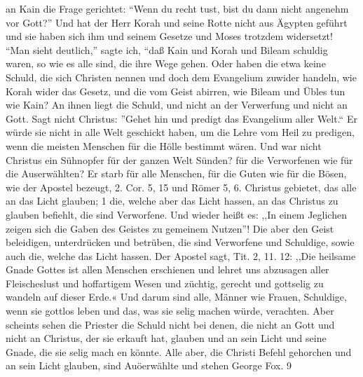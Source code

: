 an Kain die Frage gerichtet: "`Wenn du recht tust, bist du dann
nicht angenehm vor Gott?"' Und hat der Herr Korah und seine
Rotte nicht aus Ägypten geführt und sie haben sich ihm und
seinem Gesetze und Moses trotzdem widersetzt! "`Man sieht deutlich,"'
sagte ich, "`daß Kain und Korah und Bileam schuldig waren, so
wie es alle sind, die ihre Wege gehen. Oder haben die etwa
keine Schuld, die sich Christen nennen und doch dem Evangelium
zuwider handeln, wie Korah wider das Gesetz, und die vom
Geist abirren, wie Bileam und Übles tun wie Kain? An ihnen
liegt die Schuld, und nicht an der Verwerfung und nicht an Gott.
Sagt nicht Christus: "'Gehet hin und predigt das Evangelium
aller Welt."` Er würde sie nicht in alle Welt geschickt haben, um
die Lehre vom Heil zu predigen, wenn die meisten Menschen für
die Hölle bestimmt wären. Und war nicht Christus ein Sühnopfer 
für der ganzen Welt Sünden? für die Verworfenen wie für
die Auserwählten? Er starb für alle Menschen, für die Guten
wie für die Bösen, wie der Apostel bezeugt, 2. Cor. 5, 15 und
Römer 5, 6.  Christus gebietet, das alle an das Licht glauben; 1
die, welche aber das Licht hassen, an das Christus zu glauben
befiehlt, die sind Verworfene. Und wieder heißt es: ,,In einem
Jeglichen zeigen sich die Gaben des Geistes zu gemeinem Nutzen"'!
Die aber den Geist beleidigen, unterdrücken und betrüben, die
sind Verworfene und Schuldige, sowie auch die, welche das Licht
hassen. Der Apostel sagt, Tit. 2, 11. 12: ,,Die heilsame Gnade
Gottes ist allen Menschen erschienen und lehret uns abzusagen
aller Fleischeslust und hoffartigem Wesen und züchtig, gerecht und
gottselig zu wandeln auf dieser Erde.« Und darum sind alle,
Männer wie Frauen, Schuldige, wenn sie gottlos leben und das,
was sie selig machen würde, verachten. Aber scheints sehen die
Priester die Schuld nicht bei denen, die nicht an Gott und nicht
an Christus, der sie erkauft hat, glauben und an sein Licht und
seine Gnade, die sie selig mach en könnte. Alle aber, die Christi Befehl
gehorchen und an sein Licht glauben, sind Auöerwählte und stehen
George Fox. 9

